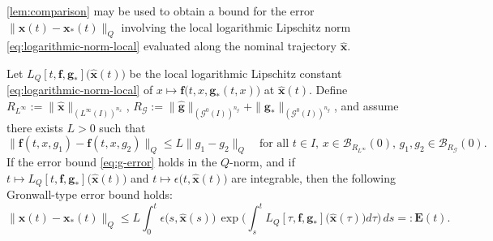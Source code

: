 \documentclass[onefignum,onetabnum]{siamart220329}
\numberwithin{equation}{section}
\newcommand{\bff}{\ensuremath{\mathbf{f}}} %
\newcommand{\bg}{\ensuremath{\mathbf{g}}} %
\newcommand{\bx}{\ensuremath{\mathbf{x}}} %
\newcommand{\BE}{\ensuremath{\mathbf{E}} } %
\newcommand {\cB} {\mathcal{B}}
\newcommand {\cG} {\mathcal{G}}
\begin{document}
\cref{lem:comparison} may be used to obtain a bound for the error  $\| \widehat{\bx}(t) - \bx_*(t) \|_Q$ 
involving the local logarithmic Lipschitz norm \cref{eq:logarithmic-norm-local} evaluated 
along the nominal trajectory $\widehat{\bx}$.

\begin{theorem}   \label{thm:error-estimate-comparison-lemma}
     Let   $L_Q[t,\bff,\bg_*]\big(  \widehat{\bx}(t) \big)$ be the local logarithmic Lipschitz constant  \cref{eq:logarithmic-norm-local}
     of $x \mapsto \bff\big(t, x, \bg_*(t, x)\big)$ at $\widehat{\bx}(t)$. Define
     $R_{L^\infty} := \| \widehat{\bx} \|_{(L^\infty(I))^{n_x}}$,
     $R_{\cG} := \| \widehat{\bg} \|_{(\cG^0(I))^{n_g}} + \| \bg_* \|_{(\cG^0(I))^{n_g}}$,
     and assume there exists $L > 0$ such that
     \begin{equation} \label{eq:uniformly-lipschitz}
     	\| \bff(t, x, g_1) -  \bff(t, x, g_2) \|_Q \le L \| g_1 - g_2 \|_Q \quad \textrm{for all $t \in I$, $x \in \cB_{R_{L^\infty}}(0)$, $g_1, g_2 \in \cB_{R_{\cG}}(0)$.}
     \end{equation}
     If the error bound \cref{eq:g-error} holds in the $Q$-norm, and if $t \mapsto L_Q[t,\bff,\bg_*]\big(  \widehat{\bx}(t) \big)$
     and $t \mapsto \epsilon\big(t, \widehat{\bx}(t) \big)$ are integrable,  then the following Gronwall-type error bound holds:
     \begin{equation}   \label{eq:error-estimate-comparison-lemma}
          \big\| \widehat{\bx}(t) - \bx_*(t) \big\|_Q
          \le L   \int_0^t    \epsilon\big(s, \widehat{\bx}(s) \big)   \, 
                             \exp\big( \int_s^t  L_Q[\tau, \bff,\bg_*]\big(  \widehat{\bx}(\tau) \big)  d\tau \big) \, ds =: \BE(t).
     \end{equation}
\end{theorem}
\end{document}
